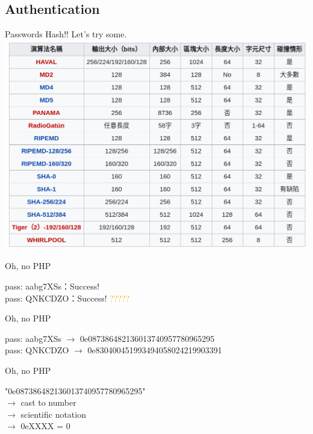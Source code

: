 \documentclass{beamer}
\begin{document}
\begin{CJK*}{UTF8}{bsmi}
    \subsection{Authentication}
    \begin{frame}{Passwords}
        Hash!! Let's try some.
        \includegraphics[width=\textwidth]{hash.png}
    \end{frame}

    \begin{frame}{Oh, no PHP}
        
        pass: aabg7XSs：Success!\\
        pass: QNKCDZO：Success! \textcolor{orange}{?????}
    \end{frame}

    \begin{frame}{Oh, no PHP}
        
        pass: aabg7XSs $\to$ 0e087386482136013740957780965295\\
        pass: QNKCDZO $\to$ 0e830400451993494058024219903391
    \end{frame}

    \begin{frame}{Oh, no PHP}
        
        "0e087386482136013740957780965295" \\
        $\to$ cast to number \\
        $\to$ scientific notation \\
        $\to$ 0eXXXX = 0
    \end{frame}


\end{CJK*}
\end{document}
